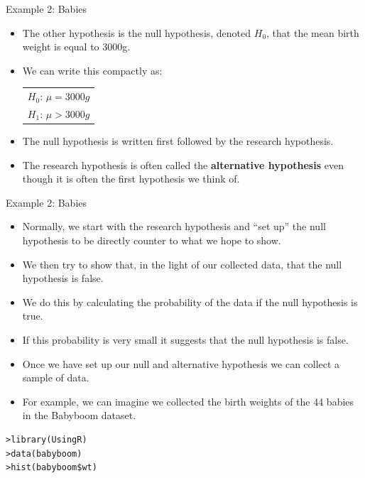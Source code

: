 \documentclass[handout]{beamer}
\begin{document}
\begin{frame}{Example 2: Babies}
\scriptsize{
\begin{itemize}

  \item The other hypothesis is the null hypothesis, denoted $H_0$, that the mean birth weight is equal to 3000g.
\item We can write this compactly as:
\begin{table}
\center
 \begin{tabular}{c}  
$H_0$: $\mu=3000g$ \\
$H_1$: $\mu>3000g$
\end{tabular} 
\end{table}

\item The null hypothesis is written first followed by the research hypothesis. 
\item The research hypothesis is often called the \textbf{alternative hypothesis} even though it is often the first hypothesis we think of.

\end{itemize}


} 
\end{frame}


\begin{frame}[fragile]{Example 2: Babies}
\scriptsize{
\begin{itemize}
  \item Normally, we start with the research hypothesis and ``set up'' the null hypothesis to be directly counter to what we hope to show. 
  \item We then try to show that, in the light of our collected data, that the null hypothesis is false. 
  \item We do this by calculating the probability of the data if the null hypothesis is true. 
  \item If this probability is very small it suggests that the null hypothesis is false.
  \item Once we have set up our null and alternative hypothesis we can collect a sample of data. 
  \item For example, we can imagine we collected the birth weights of the 44 babies in the Babyboom dataset.

\end{itemize}
\begin{verbatim}
>library(UsingR)
>data(babyboom)
>hist(babyboom$wt)
\end{verbatim}


} 
\end{frame}
\end{document}
